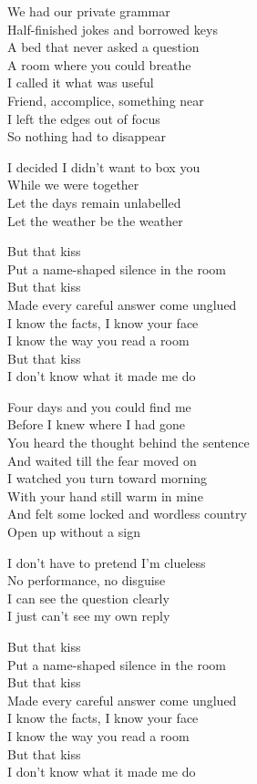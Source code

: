 \begin{lyrics}
We had our private grammar\\
Half-finished jokes and borrowed keys\\
A bed that never asked a question\\
A room where you could breathe\\
I called it what was useful\\
Friend, accomplice, something near\\
I left the edges out of focus\\
So nothing had to disappear

I decided I didn't want to box you\\
While we were together\\
Let the days remain unlabelled\\
Let the weather be the weather

But that kiss\\
Put a name-shaped silence in the room\\
But that kiss\\
Made every careful answer come unglued\\
I know the facts, I know your face\\
I know the way you read a room\\
But that kiss\\
I don't know what it made me do

Four days and you could find me\\
Before I knew where I had gone\\
You heard the thought behind the sentence\\
And waited till the fear moved on\\
I watched you turn toward morning\\
With your hand still warm in mine\\
And felt some locked and wordless country\\
Open up without a sign

I don't have to pretend I'm clueless\\
No performance, no disguise\\
I can see the question clearly\\
I just can't see my own reply

But that kiss\\
Put a name-shaped silence in the room\\
But that kiss\\
Made every careful answer come unglued\\
I know the facts, I know your face\\
I know the way you read a room\\
But that kiss\\
I don't know what it made me do


\end{lyrics}
